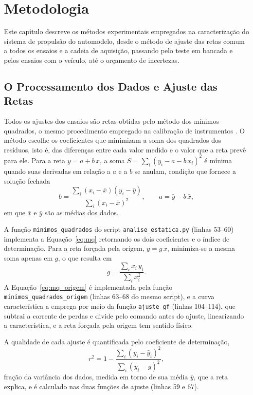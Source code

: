 \chapter{Metodologia}
\label{chap:metodologia}

Este capítulo descreve os métodos experimentais empregados na caracterização do
sistema de propulsão do automodelo, desde o método de ajuste das retas comum a todos os
ensaios e a cadeia de aquisição, passando pelo teste em bancada e pelos ensaios com o
veículo, até o orçamento de incertezas.

\section{O Processamento dos Dados e Ajuste das Retas}
\label{sec:processamento}

Todos os ajustes dos ensaios são retas obtidas pelo método dos mínimos quadrados, o mesmo
procedimento empregado na calibração de instrumentos \cite{braga_instr_calibracao}. O método
escolhe os coeficientes que minimizam a soma dos quadrados dos resíduos, isto é, das
diferenças entre cada valor medido e o valor que a reta prevê para ele. Para a reta
$y = a + b\,x$, a soma $S = \sum_i (y_i - a - b\,x_i)^2$ é mínima quando suas derivadas em
relação a $a$ e a $b$ se anulam, condição que fornece a solução fechada
\begin{equation}\label{eq:mq}
b = \frac{\sum_i (x_i - \bar{x})(y_i - \bar{y})}{\sum_i (x_i - \bar{x})^2},
\qquad
a = \bar{y} - b\,\bar{x},
\end{equation}
em que $\bar{x}$ e $\bar{y}$ são as médias dos dados. 

A função
\texttt{minimos\_quadrados} do script \texttt{analise\_estatica.py} (linhas 53--60)
implementa a Equação~\eqref{eq:mq} retornando os dois
coeficientes e o índice de determinação. Para a reta forçada pela origem,
$y = g\,x$, minimiza-se a mesma soma apenas em $g$, o que resulta em
\begin{equation}\label{eq:mq_origem}
g = \frac{\sum_i x_i\,y_i}{\sum_i x_i^2}.
\end{equation}
A Equação~\eqref{eq:mq_origem} é implementada pela função
\texttt{minimos\_quadrados\_origem} (linhas 63--68 do mesmo script), e a curva
característica a emprega por meio da função \texttt{ajuste\_gf} (linhas 104--114), que
subtrai a corrente de perdas e divide pelo comando antes do ajuste, linearizando a
característica, e a reta forçada pela origem tem sentido físico.

A qualidade de cada ajuste é quantificada pelo coeficiente de determinação,
\begin{equation}\label{eq:r2}
r^2 = 1 - \frac{\sum_i (y_i - \hat{y}_i)^2}{\sum_i (y_i - \bar{y})^2},
\end{equation}
fração da variância dos dados, medida em torno de sua média $\bar{y}$, que a reta explica,
e é calculado nas duas funções de ajuste (linhas 59 e 67).

